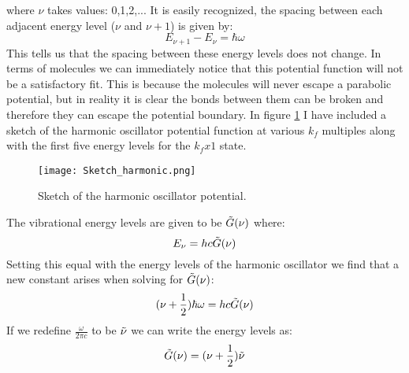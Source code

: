 \documentclass[letterpaper,12pt]{article}
\begin{document}
where $\nu$ takes values: 0,1,2,...\newline
It is easily recognized, the spacing between each adjacent energy level ($\nu$ and $\nu+1$) is given by:
\begin{equation}
    E_{\nu+1}-E_{\nu}=\hbar\omega
\end{equation}
This tells us that the spacing between these energy levels does not change. In terms of molecules we can immediately notice that this potential function will not be a satisfactory fit. This is because the molecules will never escape a parabolic potential, but in reality it is clear the bonds between them can be broken and therefore they can escape the potential boundary. In figure \ref{figure 1} I have included a sketch of the harmonic oscillator potential function at various $k_f$ multiples along with the first five energy levels for the $k_fx1$ state.
\begin{figure}[!h]
\centering
\texttt{[image: Sketch\_harmonic.png]}
\caption{Sketch of the harmonic oscillator potential.}
\label{figure 1}
\end{figure}\newline
The vibrational energy levels are given to be $\Tilde{G}(\nu)$ where:
\begin{equation}
    E_\nu=hc\Tilde{G}(\nu)
\end{equation}
Setting this equal with the energy levels of the harmonic oscillator we find that a new constant arises when solving for $\Tilde{G}(\nu)$:
\begin{equation}
    (\nu+\frac{1}{2})\hbar\omega=hc\Tilde{G}(\nu)
\end{equation}
If we redefine $\frac{\omega}{2\pi c}$ to be $\Tilde{\nu}$ we can write the energy levels as:
\begin{equation}
    \Tilde{G}(\nu)=(\nu+\frac{1}{2})\Tilde{\nu}
    \label{equation 9}
\end{equation}
\end{document}
